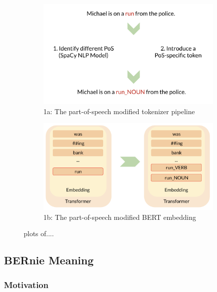 \documentclass[a4paper,12pt,twoside,openright]{report}
\begin{document}
\begin{figure}
\begin{subfigure}{.5\textwidth}
  \centering
  \includegraphics[width=\linewidth]{./assets/experiments/pipeline_tokenizer_BERnie_POS_sentence.png}
  \caption{1a: The part-of-speech modified tokenizer pipeline}
  \label{fig:sfig1}
\end{subfigure}%
\quad
\begin{subfigure}{.65\textwidth}
  \centering
  \includegraphics[width=\linewidth]{./assets/experiments/pipeline_model_BERnie_POS.png}
  \caption{1b: The part-of-speech modified BERT embedding}
  \label{fig:sfig2}
\end{subfigure}
\caption{plots of....}
\label{fig:fig}
\end{figure}

\subsection{BERnie Meaning}\label{experiment_bernie_meaning}

\subsubsection{Motivation}
\end{document}

